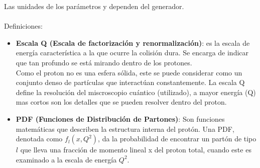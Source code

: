         Las unidades de los parámetros  y  dependen del generador.\\\\
        Definiciones:
        \begin{itemize}
            \item \textbf{Escala Q (Escala de factorización y renormalización)}: es la escala de energía característica a la que ocurre la colisión dura. Se encarga de indicar que tan profundo se está mirando dentro de los protones.\\Como el proton no es una esfera sólida, este se puede considerar como un conjunto denso de partículas que interactúan constantemente. La escala Q define la resolución del miscroscopio cuántico (utilizado), a mayor energía (Q) mas cortos son los detalles que se pueden resolver dentro del proton.
            \item \textbf{PDF (Funciones de Distribución de Partones)}: Son funciones matemáticas que describen la estructura interna del protón. Una PDF, denotada como $f_{l}(x, Q^{2})$, da la probabilidad de encontrar un partón de tipo $l$ que lleva una fracción de momento lineal x del proton total, cuando este es examinado a la escala de energía $Q^{2}$.
        \end{itemize}

